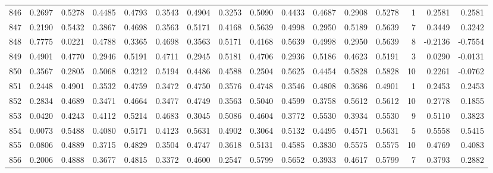 \begin{tabular}{lrrrrrrrrrrrrrrr}
846 &      0.2697 &  0.5278 &  0.4485 &  0.4793 &  0.3543 &  0.4904 &  0.3253 &  0.5090 &  0.4433 &  0.4687 &   0.2908 &     0.5278 &      1 &                    0.2581 &                     0.2581 \\
847 &      0.2190 &  0.5432 &  0.3867 &  0.4698 &  0.3563 &  0.5171 &  0.4168 &  0.5639 &  0.4998 &  0.2950 &   0.5189 &     0.5639 &      7 &                    0.3449 &                     0.3242 \\
848 &      0.7775 &  0.0221 &  0.4788 &  0.3365 &  0.4698 &  0.3563 &  0.5171 &  0.4168 &  0.5639 &  0.4998 &   0.2950 &     0.5639 &      8 &                   -0.2136 &                    -0.7554 \\
849 &      0.4901 &  0.4770 &  0.2946 &  0.5191 &  0.4711 &  0.2945 &  0.5181 &  0.4706 &  0.2936 &  0.5186 &   0.4623 &     0.5191 &      3 &                    0.0290 &                    -0.0131 \\
850 &      0.3567 &  0.2805 &  0.5068 &  0.3212 &  0.5194 &  0.4486 &  0.4588 &  0.2504 &  0.5625 &  0.4454 &   0.5828 &     0.5828 &     10 &                    0.2261 &                    -0.0762 \\
851 &      0.2448 &  0.4901 &  0.3532 &  0.4759 &  0.3472 &  0.4750 &  0.3576 &  0.4748 &  0.3546 &  0.4808 &   0.3686 &     0.4901 &      1 &                    0.2453 &                     0.2453 \\
852 &      0.2834 &  0.4689 &  0.3471 &  0.4664 &  0.3477 &  0.4749 &  0.3563 &  0.5040 &  0.4599 &  0.3758 &   0.5612 &     0.5612 &     10 &                    0.2778 &                     0.1855 \\
853 &      0.0420 &  0.4243 &  0.4112 &  0.5214 &  0.4683 &  0.3045 &  0.5086 &  0.4604 &  0.3772 &  0.5530 &   0.3934 &     0.5530 &      9 &                    0.5110 &                     0.3823 \\
854 &      0.0073 &  0.5488 &  0.4080 &  0.5171 &  0.4123 &  0.5631 &  0.4902 &  0.3064 &  0.5132 &  0.4495 &   0.4571 &     0.5631 &      5 &                    0.5558 &                     0.5415 \\
855 &      0.0806 &  0.4889 &  0.3715 &  0.4829 &  0.3504 &  0.4747 &  0.3618 &  0.5131 &  0.4585 &  0.3830 &   0.5575 &     0.5575 &     10 &                    0.4769 &                     0.4083 \\
856 &      0.2006 &  0.4888 &  0.3677 &  0.4815 &  0.3372 &  0.4600 &  0.2547 &  0.5799 &  0.5652 &  0.3933 &   0.4617 &     0.5799 &      7 &                    0.3793 &                     0.2882 \\

\end{tabular}

